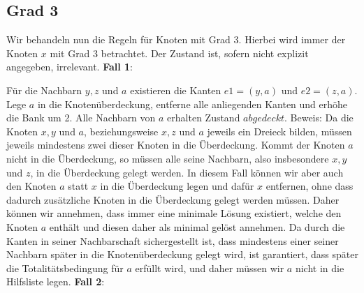 \documentclass[12pt,onecolumn, notitlepage]{scrartcl}
\begin{document}
\subsection{Grad 3}
Wir behandeln nun die Regeln für Knoten mit Grad $3$. Hierbei wird immer der Knoten $x$ mit Grad $3$ betrachtet. Der Zustand ist, sofern nicht explizit angegeben, irrelevant.\newline\newline
\textbf{Fall 1}:\newline
\begin{center}
\end{center}
Für die Nachbarn $y,z$ und $a$ existieren die Kanten $e1 = (y,a)$ und $e2 = (z,a)$. Lege $a$ in die Knotenüberdeckung, entferne alle anliegenden Kanten und erhöhe die Bank um 2. Alle Nachbarn von $a$ erhalten Zustand $abgedeckt$. \newline
Beweis: Da die Knoten $x,y$ und $a$, beziehungsweise $x,z$ und $a$ jeweils ein Dreieck bilden, müssen jeweils mindestens zwei dieser Knoten in die Überdeckung. Kommt der Knoten $a$ nicht in die Überdeckung, so müssen alle seine Nachbarn, also insbesondere $x,y$ und $z$, in die Überdeckung gelegt werden. In diesem Fall können wir aber auch den Knoten $a$ statt $x$ in die Überdeckung legen und dafür $x$ entfernen, ohne dass dadurch zusätzliche Knoten in die Überdeckung gelegt werden müssen. Daher können wir annehmen, dass immer eine minimale Lösung existiert, welche den Knoten $a$ enthält und diesen daher als minimal gelöst annehmen. Da durch die Kanten in seiner Nachbarschaft sichergestellt ist, dass mindestens einer seiner Nachbarn später in die Knotenüberdeckung gelegt wird, ist garantiert, dass später die Totalitätsbedingung für $a$ erfüllt wird, und daher müssen wir $a$ nicht in die Hilfsliste legen. \newline\newline
\textbf{Fall 2}:\newline
\begin{center}
\end{center}
\end{document}
